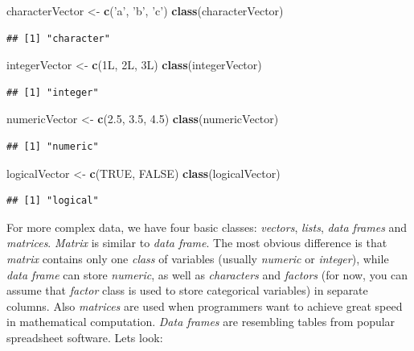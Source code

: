 \documentclass[]{book}
\newenvironment{Shaded}{\begin{snugshade}}{\end{snugshade}}
\newcommand{\KeywordTok}[1]{\textcolor[rgb]{0.13,0.29,0.53}{\textbf{#1}}}
\newcommand{\FloatTok}[1]{\textcolor[rgb]{0.00,0.00,0.81}{#1}}
\newcommand{\StringTok}[1]{\textcolor[rgb]{0.31,0.60,0.02}{#1}}
\newcommand{\OtherTok}[1]{\textcolor[rgb]{0.56,0.35,0.01}{#1}}
\newcommand{\NormalTok}[1]{#1}
\theoremstyle{definition}
\theoremstyle{definition}
\theoremstyle{definition}
\theoremstyle{remark}
\begin{document}
\begin{Shaded}
\begin{Highlighting}[]
\NormalTok{characterVector <-}\StringTok{ }\KeywordTok{c}\NormalTok{(}\StringTok{'a'}\NormalTok{, }\StringTok{'b'}\NormalTok{, }\StringTok{'c'}\NormalTok{)}
\KeywordTok{class}\NormalTok{(characterVector)}
\end{Highlighting}
\end{Shaded}

\begin{verbatim}
## [1] "character"
\end{verbatim}

\begin{Shaded}
\begin{Highlighting}[]
\NormalTok{integerVector <-}\StringTok{ }\KeywordTok{c}\NormalTok{(1L, 2L, 3L)}
\KeywordTok{class}\NormalTok{(integerVector)}
\end{Highlighting}
\end{Shaded}

\begin{verbatim}
## [1] "integer"
\end{verbatim}

\begin{Shaded}
\begin{Highlighting}[]
\NormalTok{numericVector <-}\StringTok{ }\KeywordTok{c}\NormalTok{(}\FloatTok{2.5}\NormalTok{, }\FloatTok{3.5}\NormalTok{, }\FloatTok{4.5}\NormalTok{)}
\KeywordTok{class}\NormalTok{(numericVector)}
\end{Highlighting}
\end{Shaded}

\begin{verbatim}
## [1] "numeric"
\end{verbatim}

\begin{Shaded}
\begin{Highlighting}[]
\NormalTok{logicalVector <-}\StringTok{ }\KeywordTok{c}\NormalTok{(}\OtherTok{TRUE}\NormalTok{, }\OtherTok{FALSE}\NormalTok{)}
\KeywordTok{class}\NormalTok{(logicalVector)}
\end{Highlighting}
\end{Shaded}

\begin{verbatim}
## [1] "logical"
\end{verbatim}

For more complex data, we have four basic classes: \emph{vectors},
\emph{lists}, \emph{data frames} and \emph{matrices}. \emph{Matrix} is
similar to \emph{data frame}. The most obvious difference is that
\emph{matrix} contains only one \emph{class} of variables (usually
\emph{numeric} or \emph{integer}), while \emph{data frame} can store
\emph{numeric}, as well as \emph{characters} and \emph{factors} (for
now, you can assume that \emph{factor} class is used to store
categorical variables) in separate columns. Also \emph{matrices} are
used when programmers want to achieve great speed in mathematical
computation. \emph{Data frames} are resembling tables from popular
spreadsheet software. Lets look:
\end{document}
